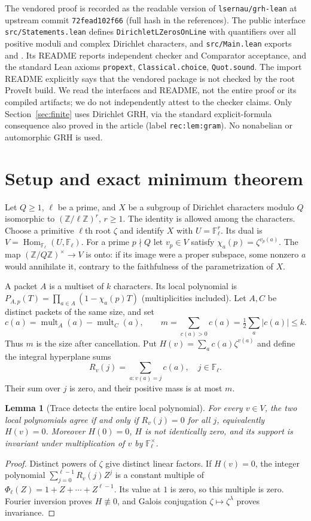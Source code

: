 \documentclass[11pt]{article}
\newtheorem{lemma}[theorem]{Lemma}
\theoremstyle{remark}\newtheorem{remark}[theorem]{Remark}
\newcommand{\F}{\mathbb F}
\newcommand{\Z}{\mathbb Z}
\begin{document}
The vendored proof \cite{vendor} is recorded as the readable version of \texttt{lsernau/grh-lean} at upstream commit \texttt{72fead102f66} (full hash in the references). The public interface \texttt{src/Statements.lean} defines \texttt{DirichletLZerosOnLine} with quantifiers over all positive moduli and complex Dirichlet characters, and \texttt{src/Main.lean} exports  and . Its README reports independent checker and Comparator acceptance, and the standard Lean axioms \texttt{propext}, \texttt{Classical.choice}, \texttt{Quot.sound}. The import README explicitly says that the vendored package is not checked by the root ProveIt build. We read the interfaces and README, not the entire proof or its compiled artifacts; we do not independently attest to the checker claims. Only Section~\ref{sec:finite} uses Dirichlet GRH, via the standard explicit-formula consequence also proved in the article (label \texttt{rec:lem:gram}). No nonabelian or automorphic GRH is used.

\section{Setup and exact minimum theorem}
Let $Q\ge 1$, $\ell$ be a prime, and $X$ be a subgroup of Dirichlet characters modulo $Q$ isomorphic to $(\Z/\ell\Z)^r$, $r\ge1$. The identity is allowed among the characters. Choose a primitive $\ell$th root $\zeta$ and identify $X$ with $U=\F_\ell^r$. Its dual is $V=\operatorname{Hom}_{\F_\ell}(U,\F_\ell)$. For a prime $p\nmid Q$ let $v_p\in V$ satisfy $\chi_a(p)=\zeta^{v_p(a)}$. The map $(\Z/Q\Z)^\times\to V$ is onto: if its image were a proper subspace, some nonzero $a$ would annihilate it, contrary to the faithfulness of the parametrization of $X$.

A packet $A$ is a multiset of $k$ characters. Its local polynomial is $P_{A,p}(T)=\prod_{a\in A}(1-\chi_a(p)T)$ (multiplicities included). Let $A,C$ be distinct packets of the same size, and set
\[
 c(a)=\operatorname{mult}_A(a)-\operatorname{mult}_C(a),\qquad
 m=\sum_{c(a)>0}c(a)=\tfrac12\sum_a|c(a)|\le k.
\]
Thus $m$ is the size after cancellation. Put $H(v)=\sum_a c(a)\zeta^{v(a)}$ and define the integral hyperplane sums
\[
 R_v(j)=\sum_{a:v(a)=j}c(a),\quad j\in\F_\ell.
\]
Their sum over $j$ is zero, and their positive mass is at most $m$.

\begin{lemma}[Trace detects the entire local polynomial]\label{lem:trace}
For every $v\in V$, the two local polynomials agree if and only if $R_v(j)=0$ for all $j$, equivalently $H(v)=0$. Moreover $H(0)=0$, $H$ is not identically zero, and its support is invariant under multiplication of $v$ by $\F_\ell^\times$.
\end{lemma}
\begin{proof}
Distinct powers of $\zeta$ give distinct linear factors. If $H(v)=0$, the integer polynomial $\sum_{j=0}^{\ell-1}R_v(j)Z^j$ is a constant multiple of $\Phi_\ell(Z)=1+Z+\cdots+Z^{\ell-1}$. Its value at $1$ is zero, so this multiple is zero. Fourier inversion proves $H\not\equiv0$, and Galois conjugation $\zeta\mapsto\zeta^\lambda$ proves invariance.
\end{proof}
\end{document}
